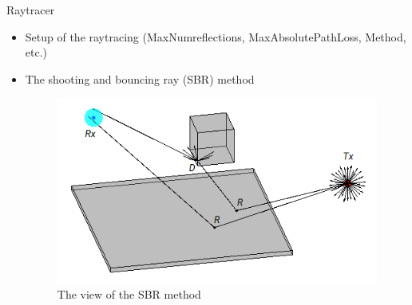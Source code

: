 \documentclass{beamer}
\begin{document}
\begin{frame}[t]{Raytracer}
	\begin{itemize}
        \item Setup of the raytracing (MaxNumreflections, MaxAbsolutePathLoss, Method, etc.)
	    \item The shooting and bouncing ray (SBR) method
        \vspace{0.5\baselineskip}
            \begin{figure}
            	\centering
            	\includegraphics[scale=.5]{figures/ray_tracing_sbr_method.png}
            	\caption{The view of the SBR method \cite{ray_tracer_inputs}}
            \end{figure}
	\end{itemize}
\end{frame}
\end{document}
